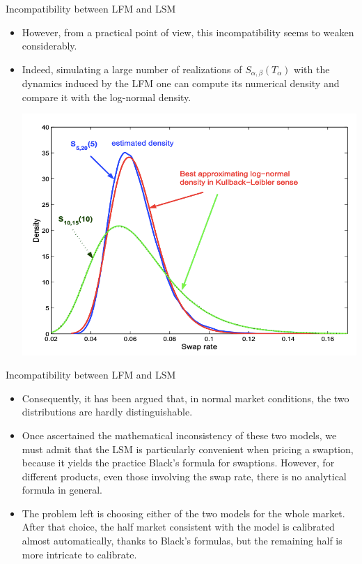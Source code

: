 \documentclass{beamer}
\begin{document}
\begin{frame}{Incompatibility between LFM and LSM}
  \begin{itemize}
  \item<1-> However, from a practical point of view, this incompatibility seems to weaken considerably. 
  \item<2-> Indeed, simulating a large number of realizations of $S_{\alpha,\beta}(T_\alpha)$ with the dynamics induced by the LFM one can compute its numerical density and compare it with the log-normal density. 
  \begin{center}
  	\includegraphics[width=0.45\linewidth]{images/swap_rate_LFM}
  \end{center}
  \end{itemize}
\end{frame}

\begin{frame}{Incompatibility between LFM and LSM}
	\begin{itemize}
	\item<1-> Consequently, it has been argued that, in normal market conditions, the two distributions are hardly distinguishable.
	\item<2-> Once ascertained the mathematical inconsistency of these two models, we must admit that the LSM is particularly convenient when pricing a swaption, because it yields the practice Black’s formula for swaptions. However, for different products, even those involving the swap rate, there is no analytical formula in general. 
  \item<3-> The problem left is choosing either of the two models for the whole market. After that choice, the half market consistent with the model is calibrated almost automatically, thanks to Black’s formulas, but the remaining half is more intricate to calibrate.
	\end{itemize}
\end{frame}
\end{document}
